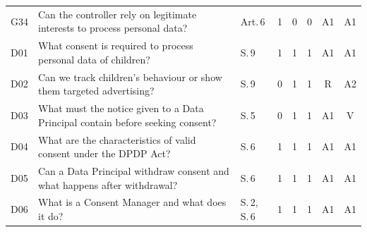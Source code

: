 \begin{tabular}{@{}llp{3.1cm}cccc c@{}}
G34 & Can the controller rely on legitimate interests to process personal data? & Art.\,6 & 1 & 0 & 0 & A1 & A1 \\
D01 & What consent is required to process personal data of children? & S.\,9 & 1 & 1 & 1 & A1 & A1 \\
D02 & Can we track children's behaviour or show them targeted advertising? & S.\,9 & 0 & 1 & 1 & R & A2 \\
D03 & What must the notice given to a Data Principal contain before seeking consent? & S.\,5 & 0 & 1 & 1 & A1 & V \\
D04 & What are the characteristics of valid consent under the DPDP Act? & S.\,6 & 1 & 1 & 1 & A1 & A1 \\
D05 & Can a Data Principal withdraw consent and what happens after withdrawal? & S.\,6 & 1 & 1 & 1 & A1 & A1 \\
D06 & What is a Consent Manager and what does it do? & S.\,2, S.\,6 & 1 & 1 & 1 & A1 & A1 \\
\bottomrule
\end{tabular}